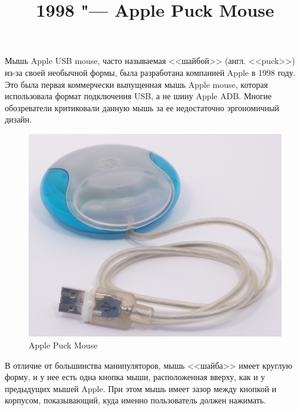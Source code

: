 \documentclass[11pt, a4paper]{article}
\begin{document}
\title{1998 "--- Apple Puck Mouse}

\maketitle
Мышь Apple USB mouse, часто называемая <<шайбой>> (англ. <<puck>>)  из-за своей необычной формы, была разработана компанией Apple в 1998 году. Это была первая коммерчески выпущенная мышь Apple mouse, которая использовала формат подключения USB, а не шину Apple ADB. Многие обозреватели критиковали данную мышь за ее недостаточно эргономичный дизайн.

\begin{figure}[h]
    \centering
    \includegraphics[scale=0.3]{1998_apple_puck/apple.jpg}
    \caption{Apple Puck Mouse}
    \label{fig:pic}
\end{figure}

В отличие от большинства манипуляторов, мышь <<шайба>> имеет круглую форму, и у нее есть одна кнопка мыши, расположенная вверху, как и у предыдущих мышей Apple. При этом мышь имеет зазор между кнопкой и корпусом, показывающий, куда именно пользователь должен нажимать.
\end{document}
